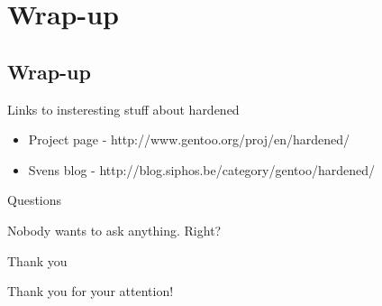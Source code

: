 \documentclass{beamer}
\begin{document}
\section{Wrap-up}

\subsection{Wrap-up}

\begin{frame}{Links to insteresting stuff about hardened}
	\begin{itemize}
		\item Project page - http://www.gentoo.org/proj/en/hardened/
		\item Svens blog - http://blog.siphos.be/category/gentoo/hardened/
	\end{itemize}
\end{frame}

\begin{frame}{Questions}
	\begin{center}Nobody wants to ask anything. Right?\end{center}
\end{frame}

\begin{frame}{Thank you}
	\begin{center}Thank you for your attention!\end{center}
\end{frame}
\end{document}
